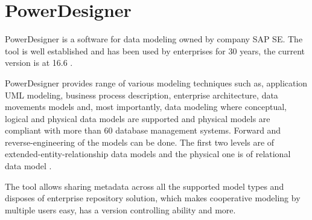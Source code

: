 \section{PowerDesigner}

PowerDesigner is a software for data modeling owned by company SAP SE. The tool is well established and has been used by enterprises for 30 years, the current version is at 16.6 \cite{PowerDesignerHistory}.

PowerDesigner provides range of various modeling techniques such as, application UML modeling, business process description, enterprise architecture, data movements models and, most importantly, data modeling where conceptual, logical and physical data models are supported and physical models are compliant with more than 60 database management systems.
Forward and reverse-engineering of the models can be done.
The first two levels are of extended-entity-relationship data models and the physical one is of relational data model \cite{PowerDesignerFeatures}.

The tool allows sharing metadata across all the supported model types and disposes of enterprise repository solution, which makes cooperative modeling by multiple users easy, has a version controlling ability and more.